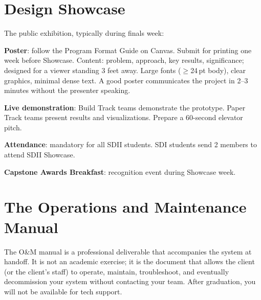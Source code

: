 \section{Design Showcase}
The public exhibition, typically during finals week:

\textbf{Poster}: follow the Program Format Guide on Canvas. Submit for printing one week before Showcase. Content: problem, approach, key results, significance; designed for a viewer standing 3 feet away. Large fonts ($\geq$24\,pt body), clear graphics, minimal dense text. A good poster communicates the project in 2--3 minutes without the presenter speaking.

\textbf{Live demonstration}: Build Track teams demonstrate the prototype. Paper Track teams present results and visualizations. Prepare a 60-second elevator pitch.

\textbf{Attendance}: mandatory for all SDII students. SDI students send 2 members to attend SDII Showcase.

\textbf{Capstone Awards Breakfast}: recognition event during Showcase week.

\section{The Operations and Maintenance Manual}
The O\&M manual is a professional deliverable that accompanies the system at handoff. It is not an academic exercise; it is the document that allows the client (or the client's staff) to operate, maintain, troubleshoot, and eventually decommission your system without contacting your team. After graduation, you will not be available for tech support.

